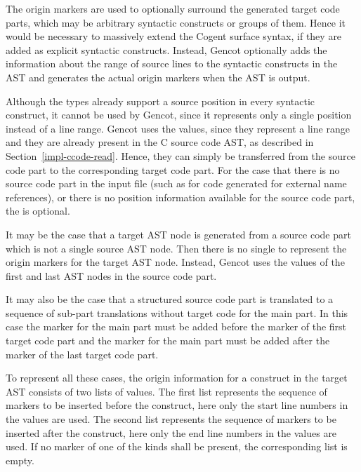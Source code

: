 The origin markers are used to optionally surround the generated target code parts, which may be arbitrary syntactic constructs
or groups of them. Hence it would be necessary to massively extend the Cogent surface syntax, if they are added as explicit 
syntactic constructs. Instead, Gencot optionally adds the information about the range of source lines to the syntactic
constructs in the AST and generates the actual origin markers when the AST is output. 

Although the  types already support a source position in every syntactic construct, it cannot be used by Gencot,
since it represents only a single position instead of a line range. Gencot uses the  values, since they represent
a line range and they are already present in the C source code AST, as described in Section~\ref{impl-ccode-read}. Hence, they
can simply be transferred from the source code part to the corresponding target code part. For the case that there is no
source code part in the input file (such as for code generated for external name references), or there is no position 
information available for the source code part, the  is optional.

It may be the case that a target AST node is generated from a source code part which is not a single source AST node. Then
there is no single  to represent the origin markers for the target AST node. Instead, Gencot uses the 
 values of the first and last AST nodes in the source code part.

It may also be the case that a structured source code part is translated to a sequence of sub-part translations without target
code for the main part. In this case the  marker for the main part must be added before the  
marker of the first target code part and the  marker for the main part must be added after the  
marker of the last target code part. 

To represent all these cases, the origin information for a construct in the target AST consists of two lists of 
values. The first list represents the sequence of  markers to be inserted before the construct, here only the
start line numbers in the  values are used. The second list represents the sequence of  markers 
to be inserted after the construct, here only the end line numbers in the  values are used. If no marker of
one of the kinds shall be present, the corresponding list is empty.

